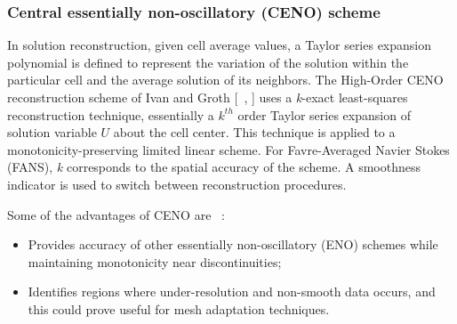 \subsubsection{Central essentially non-oscillatory (CENO) scheme}
\label{section:CENO}
In solution reconstruction, given cell average values, a Taylor series expansion polynomial is defined to represent the variation of the solution within the particular cell and the average solution of its neighbors. 
The High-Order CENO reconstruction scheme of Ivan and Groth [~\cite{ivan:2007}, \cite{ivan:2013b}] uses a \textit{k}-exact least-squares reconstruction technique, essentially a $k^{th}$ order Taylor series expansion of solution variable $U$ about the cell center. This technique is applied to a monotonicity-preserving limited linear scheme. For Favre-Averaged Navier Stokes (FANS), \textit{k} corresponds to the spatial accuracy of the scheme. A smoothness indicator is used to switch between reconstruction procedures.\par
Some of the advantages of CENO are ~\cite{Groth:2013}:
\begin{itemize}
\setlength\itemsep{0.1em}
\item Provides accuracy of other essentially non-oscillatory (ENO) schemes while maintaining monotonicity near discontinuities;
\item Identifies regions where under-resolution and non-smooth data occurs, and this could prove useful for mesh adaptation techniques.
\end{itemize}
